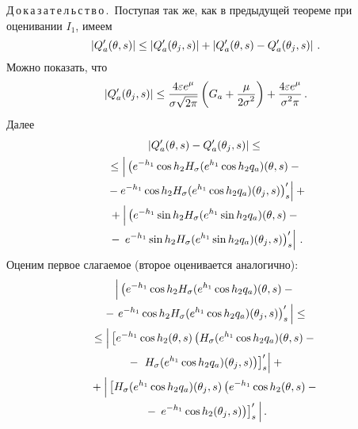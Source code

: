 \begin{multicols}{2}
\noindent
Д\,о\,к\,а\,з\,а\,т\,е\,л\,ь\,с\,т\,в\,о\,.\ 
Поступая так же, как в предыду\-щей теореме при оценивании $I_1$, имеем
\begin{equation}
\left|Q'_a(\theta,s)\right|\leq\left|Q'_a(\theta_j,s)\right|+\left|Q'_a(\theta,s)-Q'_a(\theta_j,s)\right|\,.
\label{e12sh}
\end{equation}
Можно показать, что
\begin{equation}
\left|Q'_a(\theta_j,s)\right|
\leq \displaystyle\frac{\displaystyle 4\varepsilon e^{\mu}\mathstrut}{\displaystyle \sigma\sqrt{2\pi}\mathstrut}\left(G_a+\displaystyle\frac{\displaystyle \mu\mathstrut}{\displaystyle 2\sigma^2\mathstrut}\right)+
\displaystyle\frac{\displaystyle 4\varepsilon e^{\mu}\mathstrut}{\displaystyle \sigma^2\pi\mathstrut}\,.
\label{e13sh}
\end{equation}
Далее
\begin{multline*}
\left|Q'_a(\theta,s)-Q'_a(\theta_j,s)\right|\leq{}\\
{}\leq\left| 
\vphantom{{}\left.\left.+e^{-h_1}\sin{h_2}H_\sigma(e^{h_1}\sin{h_2}q_a)(\theta,s)\right)'_s\right| \leq{}}
\left(e^{-h_1}\cos{h_2}H_\sigma(e^{h_1}\cos{h_2}q_a)(\theta,s)-{}\right.\right.\\
\left.\left.{}-e^{-h_1}\cos{h_2}H_\sigma(e^{h_1}\cos{h_2}q_a)(\theta_j,s)\right)'_s\right| +{}\\
{}+\left|
\vphantom{{}\left.\left.+e^{-h_1}\sin{h_2}H_\sigma(e^{h_1}\sin{h_2}q_a)(\theta,s)\right)'_s\right| \leq{}}
 \left(e^{-h_1}\sin{h_2}H_\sigma(e^{h_1}\sin{h_2}q_a)(\theta,s)-{}\right.\right.\\
{}-\left.\left.e^{-h_1}\sin{h_2}H_\sigma(e^{h_1}\sin{h_2}q_a)(\theta_j,s)\right)'_s\right| \,.
\end{multline*}
Оценим первое слагаемое (второе оценивается аналогично):
\begin{multline*}
\Big|\left( e^{-h_1}\cos{h_2}H_\sigma(e^{h_1}\cos{h_2}q_a)(\theta,s)-{}\right.\\
{}-\left.e^{-h_1}\cos{h_2}H_\sigma(e^{h_1}\cos{h_2}q_a)(\theta_j,s)\right)'_s \Big|\leq{}\\
{}\leq\left|
\vphantom{{}\left.\left.+e^{-h_1}\sin{h_2}H_\sigma(e^{h_1}\sin{h_2}q_a)(\theta,s)\right)'_s\right| \leq{}}
\left[e^{-h_1}\cos{h_2}(\theta,s)\left(H_\sigma(e^{h_1}\cos{h_2}q_a)(\theta,s)-{}\right.\right.\right.\\
{}-\left.\left.\left.H_\sigma(e^{h_1}\cos{h_2}q_a)(\theta_j,s)\right)\right]'_s\right| +{}\\
{}+\Big| 
\left[H_\sigma(e^{h_1}\cos{h_2}q_a)(\theta_j,s)\left(e^{-h_1}\cos{h_2}(\theta,s)-{}\right.\right.\\
{}-\left.\left.e^{-h_1}\cos{h_2}(\theta_j,s)\right)\right]'_s\Big| \,.
\end{multline*}

\end{multicols}
